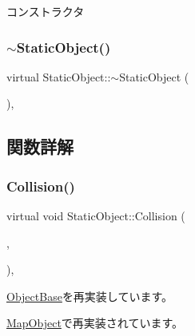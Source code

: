 コンストラクタ 

\mbox{\label{class_static_object_ac27301fc3d8d22aff5664f592c375cd8}} 
\subsubsection{\texorpdfstring{$\sim$\+Static\+Object()}{~StaticObject()}}
{\footnotesize\ttfamily virtual Static\+Object\+::$\sim$\+Static\+Object (\begin{DoxyParamCaption}{ }\end{DoxyParamCaption})\hspace{0.3cm}{\ttfamily [inline]}, {\ttfamily [virtual]}}



\subsection{関数詳解}
\mbox{\label{class_static_object_abe05f711f0d62319e1a11419813c5d50}} 
\subsubsection{\texorpdfstring{Collision()}{Collision()}}
{\footnotesize\ttfamily virtual void Static\+Object\+::\+Collision (\begin{DoxyParamCaption}\item[{\mbox{\hyperlink{class_object_base}{Object\+Base}} $\ast$}]{,  }\item[{\mbox{\hyperlink{common_8h_afb0c5e21d4133ff4f200992c0b534e1b}{V\+E\+C2}}}]{ }\end{DoxyParamCaption})\hspace{0.3cm}{\ttfamily [inline]}, {\ttfamily [virtual]}}



\mbox{\hyperlink{class_object_base_ad772d7a42f5e46c39481f5db22ee8193}{Object\+Base}}を再実装しています。



\mbox{\hyperlink{class_map_object_a61c2b7e046b76d98adbf23c9e6302918}{Map\+Object}}で再実装されています。

\mbox{\label{class_static_object_ab17d0cb5b2544054022356a7ee4000db}} 
